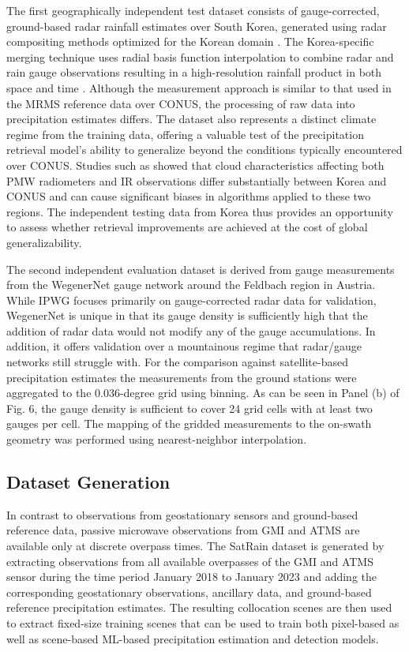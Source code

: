 \documentclass[11pt]{article}
\begin{document}
The first geographically independent test dataset consists of gauge-corrected,
ground-based radar rainfall estimates over South Korea, generated using radar
compositing methods optimized for the Korean domain
\citep{Kwon2015RadarComparison}. The Korea-specific merging technique uses
radial basis function interpolation to combine radar and rain gauge observations
resulting in a high-resolution rainfall product in both space and time \citep{Ryu2025RBFMerging}.
Although the measurement approach is similar to that used in the MRMS reference
data over CONUS, the processing of raw data into precipitation estimates
differs. The dataset also represents a distinct climate regime from the training
data, offering a valuable test of the precipitation retrieval model’s ability to
generalize beyond the conditions typically encountered over CONUS. Studies such
as \cite{Sohn2013WarmRain} showed that cloud characteristics affecting both PMW
radiometers and IR observations differ substantially between Korea and CONUS and
can cause significant biases in algorithms applied to these two regions. The
independent testing data from Korea thus provides an opportunity to assess
whether retrieval improvements are achieved at the cost of global
generalizability.

The second independent evaluation dataset is derived from gauge measurements from the WegenerNet \citep{Fuchsberger2021WegenerNet} gauge network around the Feldbach region in Austria. While IPWG focuses primarily on gauge-corrected radar data for validation, WegenerNet is unique in that its gauge density is sufficiently high that the addition of radar data would not modify any of the gauge accumulations. In addition, it offers validation over a mountainous regime that radar/gauge networks still struggle with. For the comparison against satellite-based precipitation estimates the measurements from the ground stations were aggregated to the 0.036-degree grid using binning. As can be seen in Panel (b) of Fig. 6, the gauge density is sufficient to cover 24 grid cells with at least two gauges per cell. The mapping of the gridded measurements to the on-swath geometry was performed using nearest-neighbor interpolation.


\subsection{Dataset Generation}

In contrast to observations from geostationary sensors and ground-based reference data, passive microwave observations from GMI and ATMS are available only at discrete overpass times. The SatRain dataset is generated by extracting observations from all available overpasses of the GMI and ATMS sensor during the time period January 2018 to January 2023 and adding the corresponding geostationary observations, ancillary data, and ground-based reference precipitation estimates. The resulting collocation scenes are then used to extract fixed-size training scenes that can be used to train both pixel-based as well as scene-based ML-based precipitation estimation and detection models.
\end{document}
